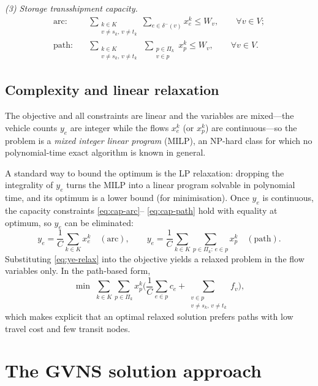 \documentclass[runningheads]{llncs}
\newcommand{\Vv}{V}
\begin{document}
\noindent\emph{(3) Storage transshipment capacity.}
\begin{align}
\text{arc:}\quad
&\sum_{\substack{k\in K\\ v\neq s_k,\,v\neq t_k}}\sum_{e\in\delta^-(v)} x^k_e
 \le W_v, \qquad \forall v\in \Vv;
\label{eq:node-arc}\\
\text{path:}\quad
&\sum_{\substack{k\in K\\ v\neq s_k,\,v\neq t_k}}\ \sum_{\substack{p\in\Pi_k\\ v\in p}}
 x^k_p \le W_v, \qquad \forall v\in \Vv.
\label{eq:node-path}
\end{align}

\subsection{Complexity and linear relaxation}
\label{sec:relax}
The objective and all constraints are linear and the variables are mixed---the
vehicle counts $y_e$ are integer while the flows $x^k_e$ (or $x^k_p$) are
continuous---so the problem is a \emph{mixed integer linear program} (MILP), an
NP-hard class for which no polynomial-time exact algorithm is known in general.

A standard way to bound the optimum is the LP relaxation: dropping the
integrality of $y_e$ turns the MILP into a linear program solvable in
polynomial time, and its optimum is a lower bound (for minimisation). Once
$y_e$ is continuous, the capacity constraints \eqref{eq:cap-arc}--%
\eqref{eq:cap-path} hold with equality at optimum, so $y_e$ can be eliminated:
\begin{equation}
y_e=\frac1C\sum_{k\in K} x^k_e \quad(\text{arc}), \qquad
y_e=\frac1C\sum_{k\in K}\sum_{p\in\Pi_k:\,e\in p} x^k_p \quad(\text{path}).
\label{eq:ye-relax}
\end{equation}
Substituting \eqref{eq:ye-relax} into the objective yields a relaxed problem
in the flow variables only. In the path-based form,
\begin{equation}
\min\;\sum_{k\in K}\sum_{p\in\Pi_k} x^k_p
\Bigg(\frac1C\sum_{e\in p} c_e+\sum_{\substack{v\in p\\ v\neq s_k,\,v\neq t_k}}
f_v\Bigg),
\label{eq:relax-path}
\end{equation}
which makes explicit that an optimal relaxed solution prefers paths with low
travel cost and few transit nodes.

\section{The GVNS solution approach}
\label{sec:gvns}
\end{document}
